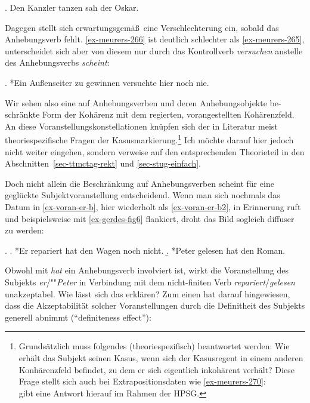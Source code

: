 \ex. Den Kanzler tanzen sah der Oskar. \hfill \citep[(275)]{Meurers:99}\label{ex-meurers-275}

Dagegen stellt sich erwartungsgemä\ss\ eine Verschlechterung ein, sobald das Anhebungsverb fehlt. \ref{ex-meurers-266} ist deutlich schlechter als \ref{ex-meurers-265}, unterscheidet sich aber von diesem nur durch das Kontrollverb {\it versuchen} anstelle des Anhebungsverbs {\it scheint}: 

\ex. *Ein Au\ss enseiter zu gewinnen versuchte hier noch nie. \hfill \citep[(266)]{Meurers:99}\label{ex-meurers-266}

Wir sehen also eine auf Anhebungsverben und deren Anhebungsobjekte be-\linebreak schränkte Form der Kohärenz mit dem regierten, vorangestellten Kohärenzfeld. An diese Voranstellungskonstellationen knüpfen sich der in Literatur meist theoriespezifische Fragen der Kasusmarkierung.\footnote{Grundsätzlich muss folgendes (theoriespezifisch) beantwortet werden: Wie erhält das Subjekt seinen Kasus, wenn sich der Kasusregent in einem anderen Konhärenzfeld befindet, zu dem er sich eigentlich inkohärent verhält? Diese Frage stellt sich auch bei Extrapositionsdaten wie \ref{ex-meurers-270}:\\
\citet[316ff]{Meurers:99} gibt eine Antwort hierauf im Rahmen der HPSG.} Ich möchte darauf hier jedoch nicht weiter eingehen, sondern verweise auf den entsprechenden Theorieteil in den Abschnitten~\ref{sec-ttmctag-rekt} und \ref{sec-stug-einfach}.

Doch nicht allein die Beschränkung auf Anhebungsverben scheint für eine geglückte Subjektvoranstellung entscheidend. Wenn man sich nochmals das Datum in \ref{ex-voran-er-b}, hier wiederholt als \ref{ex-voran-er-b2}, in Erinnerung ruft und beispielsweise mit \ref{ex-gerdes-fig6} flankiert, droht das Bild sogleich diffuser zu werden: 

\ex. 
\a. *Er repariert hat den Wagen noch nicht.\label{ex-voran-er-b2} 
\b. *Peter gelesen hat den Roman. \hfill \citep[Figure~6]{Gerdes:04}\label{ex-gerdes-fig6} 

Obwohl mit {\it hat} ein Anhebungsverb involviert ist, wirkt die Voranstellung des Subjekts {\it er}/""{\it Peter} in Verbindung mit dem nicht-finiten Verb {\it repariert}/{\it gelesen} unakzeptabel. Wie lässt sich das erklären? Zum einen hat \cite{Haider:90} darauf hingewiesen, dass die Akzeptabilität solcher Voranstellungen durch die Definitheit des Subjekts generell abnimmt ("`definiteness effect"'):   

